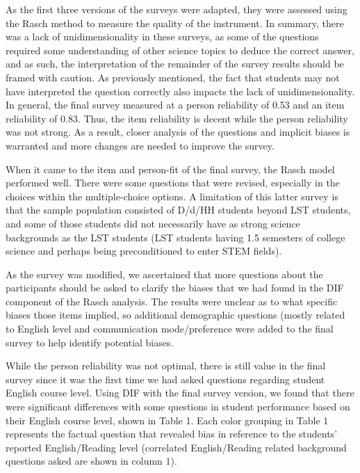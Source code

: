 \documentclass[11.5pt]{sig-alternate} %
\begin{document}
\begin{large}
 As the first three versions of the surveys were adapted, they were assessed using the Rasch method to measure the quality of the instrument. In summary, there was a lack of unidimensionality in these surveys, as some of the questions required some understanding of other science topics to deduce the correct answer, and as such, the interpretation of the remainder of the survey results should be framed with caution. As previously mentioned, the fact that students may not have interpreted the question correctly also impacts the lack of unidimensionality. In general, the final survey measured at a person reliability of 0.53 and an item reliability of 0.83. Thus, the item reliability is decent while the person reliability was not strong. As a result, closer analysis of the questions and implicit biases is warranted and more changes are needed to improve the survey.

When it came to the item and person-fit of the final survey, the Rasch model performed well. There were some questions that were revised, especially in the choices within the multiple-choice options. A limitation of this latter survey is that the sample population consisted of D/d/HH students beyond LST students, and some of those students did not necessarily have as strong science backgrounds as the LST students (LST students having 1.5 semesters of college science and perhaps being preconditioned to enter STEM fields).  

As the survey was modified, we ascertained that more questions about the participants should be asked to clarify the biases that we had found in the DIF component of the Rasch analysis. The results were unclear as to what specific biases those items implied, so additional demographic questions (mostly related to English level and communication mode/preference were added to the final survey to help identify potential biases. 

While the person reliability was not optimal, there is still value in the final survey since it was the first time we had asked questions regarding student English course level. Using DIF with the final survey version, we found that there were significant differences with some questions in student performance based on their English course level, shown in Table 1. Each color grouping in Table 1 represents the factual question that revealed bias in reference to the students’ reported English/Reading level (correlated English/Reading related background questions asked are shown in column 1).



\end{large}
\end{document}
